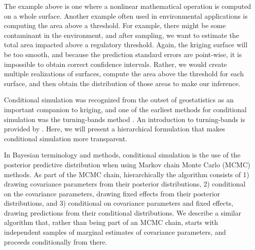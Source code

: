 \documentclass[12pt, titlepage]{article}
\begin{document}
The example above is one where a nonlinear mathematical operation is computed on a whole surface.  Another example often used in environmental applications is computing the area above a threshold.  For example, there might be some contaminant in the environment, and after sampling, we want to estimate the total area impacted above a regulatory threshold.  Again, the kriging surface will be too smooth, and because the prediction standard errors are point-wise, it is impossible to obtain correct confidence intervals.  Rather, we would create multiple realizations of surfaces, compute the area above the threshold for each surface, and then obtain the distribution of those areas to make our inference.

Conditional simulation was recognized from the outset of geostatistics as an important companion to kriging, and one of the earliest methods for conditional simulation was the turning-bands method \citep{matheron_intrinsic_1973}.  An introduction to turning-bands is provided by \citet{mantoglou_turning_1982}.  Here, we will present a hierarchical formulation that makes conditional simulation more transparent.  

In Bayesian terminology and methods, conditional simulation is the use of the posterior predictive distribution when using Markov chain Monte Carlo (MCMC) methods.  As part of the MCMC chain, hierarchically the algorithm consists of 1) drawing covariance parameters from their posterior distributions, 2) conditional on the covariance parameters, drawing fixed effects from their posterior distributions, and 3) conditional on covariance parameters and fixed effects, drawing predictions from their conditional distributions.  We describe a similar algorithm that, rather than being part of an MCMC chain, starts with independent samples of marginal estimates of covariance parameters, and proceeds conditionally from there. 
\end{document}
